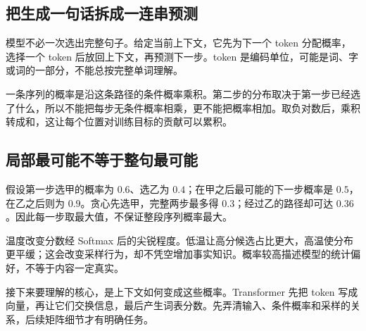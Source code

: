 \subsection*{把生成一句话拆成一连串预测}
模型不必一次选出完整句子。给定当前上下文，它先为下一个 token 分配概率，选择一个 token 后放回上下文，再预测下一步。token 是编码单位，可能是词、字或词的一部分，不能总按完整单词理解。

一条序列的概率是沿这条路径的条件概率乘积。第二步的分布取决于第一步已经选了什么，所以不能把每步无条件概率相乘，更不能把概率相加。取负对数后，乘积转成和，这让每个位置对训练目标的贡献可以累积。

\subsection*{局部最可能不等于整句最可能}
假设第一步选甲的概率为 $0.6$、选乙为 $0.4$；在甲之后最可能的下一步概率是 $0.5$，在乙之后则为 $0.9$。贪心先选甲，完整两步最多得 $0.3$；经过乙的路径却可达 $0.36$。因此每一步取最大值，不保证整段序列概率最大。

温度改变分数经 Softmax 后的尖锐程度。低温让高分候选占比更大，高温使分布更平缓；这会改变采样行为，却不凭空增加事实知识。概率较高描述模型的统计偏好，不等于内容一定真实。

接下来要理解的核心，是上下文如何变成这些概率。Transformer 先把 token 写成向量，再让它们交换信息，最后产生词表分数。先弄清输入、条件概率和采样的关系，后续矩阵细节才有明确任务。
